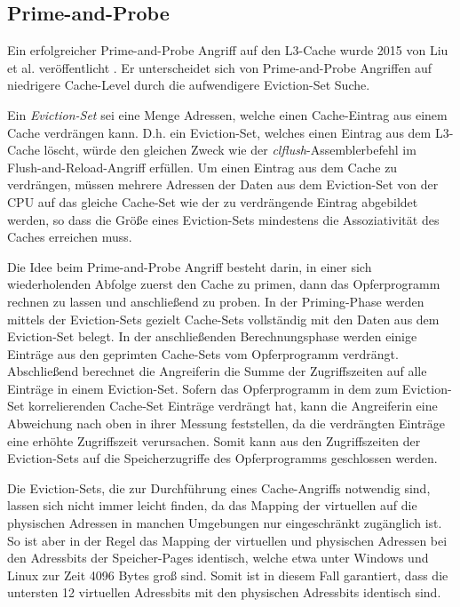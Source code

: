 \subsection{Prime-and-Probe}

Ein erfolgreicher Prime-and-Probe Angriff auf den L3-Cache wurde 2015 von Liu et al. veröffentlicht \cite{LiuPrimeAndProbe}.
Er unterscheidet sich von Prime-and-Probe Angriffen auf niedrigere Cache-Level durch die aufwendigere Eviction-Set Suche.

Ein \textit{Eviction-Set} sei eine Menge Adressen, welche einen Cache-Eintrag aus einem Cache verdrängen kann. D.h. ein Eviction-Set, welches einen Eintrag aus dem L3-Cache löscht, würde den gleichen Zweck wie der \textit {clflush}-Assemblerbefehl im Flush-and-Reload-Angriff erfüllen. 
Um einen Eintrag aus dem Cache zu verdrängen, müssen mehrere Adressen der Daten aus dem Eviction-Set von der CPU auf das gleiche Cache-Set wie der zu verdrängende Eintrag abgebildet werden, so dass die Größe eines Eviction-Sets mindestens die Assoziativität des Caches erreichen muss.

Die Idee beim Prime-and-Probe Angriff besteht darin, in einer sich wiederholenden Abfolge zuerst den Cache zu primen, dann das Opferprogramm rechnen zu lassen und anschließend zu proben.
In der Priming-Phase werden mittels der Eviction-Sets gezielt Cache-Sets vollständig mit den Daten aus dem Eviction-Set belegt.
In der anschließenden Berechnungsphase werden einige Einträge aus den geprimten Cache-Sets vom Opferprogramm verdrängt. Abschließend berechnet die Angreiferin die Summe der Zugriffszeiten auf alle Einträge in einem Eviction-Set.
Sofern das Opferprogramm in dem zum Eviction-Set korrelierenden Cache-Set Einträge verdrängt hat, kann die Angreiferin eine Abweichung nach oben in ihrer Messung feststellen, da die verdrängten Einträge eine erhöhte Zugriffszeit verursachen. Somit kann aus den Zugriffszeiten der Eviction-Sets auf die Speicherzugriffe des Opferprogramms geschlossen werden.

Die Eviction-Sets, die zur Durchführung eines Cache-Angriffs notwendig sind, lassen sich nicht immer leicht finden, da das Mapping der virtuellen auf die physischen Adressen in manchen Umgebungen nur eingeschränkt zugänglich ist.
So ist aber in der Regel das Mapping der virtuellen und physischen Adressen bei den Adressbits der Speicher-Pages identisch, welche etwa unter Windows und Linux zur Zeit 4096 Bytes groß sind. Somit ist in diesem Fall garantiert, dass die untersten 12 virtuellen Adressbits mit den physischen Adressbits identisch sind. 

